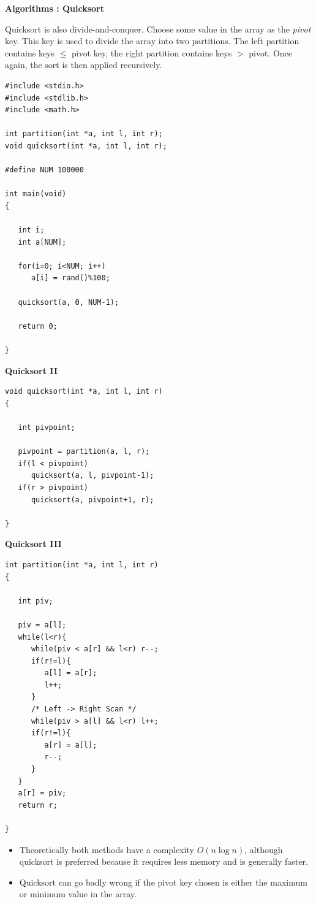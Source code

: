 \newpage
{\samepage
\begin{center}
{\Large{\bf Algorithms : Quicksort}}
\end{center}
Quicksort is also divide-and-conquer. Choose some value
in the array as the {\it pivot} key. This key is used to divide
the array into two partitions. The left partition contains keys
$\leq$ pivot key, the right partition contains keys $>$ pivot.
Once again, the sort is then applied recursively.
{\small
\begin{verbatim}
#include <stdio.h>
#include <stdlib.h>
#include <math.h>

int partition(int *a, int l, int r);
void quicksort(int *a, int l, int r);

#define NUM 100000

int main(void)
{

   int i;
   int a[NUM];

   for(i=0; i<NUM; i++)
      a[i] = rand()%100;

   quicksort(a, 0, NUM-1);

   return 0;

}
\end{verbatim}
}}

\newpage
{\samepage
\begin{center}
{\Large{\bf Quicksort II}}
\end{center}
\begin{verbatim}
void quicksort(int *a, int l, int r)
{

   int pivpoint;

   pivpoint = partition(a, l, r);
   if(l < pivpoint)
      quicksort(a, l, pivpoint-1);
   if(r > pivpoint)
      quicksort(a, pivpoint+1, r);

}

\end{verbatim}
}

\newpage
{\samepage
\begin{center}
{\Large{\bf Quicksort III}}
\end{center}
{\small
\begin{verbatim}
int partition(int *a, int l, int r)
{

   int piv;

   piv = a[l];
   while(l<r){
      while(piv < a[r] && l<r) r--;
      if(r!=l){
         a[l] = a[r];
         l++;
      }
      /* Left -> Right Scan */
      while(piv > a[l] && l<r) l++;
      if(r!=l){
         a[r] = a[l];
         r--;
      }
   }
   a[r] = piv;
   return r;

}
\end{verbatim}
\begin{itemize}
\item Theoretically both methods have a complexity $O(n \log n)$,
although quicksort is preferred because it requires less memory and
is generally faster.
\item Quicksort can go badly wrong if the pivot key chosen is either
the maximum or minimum value in the array.
\end{itemize}
}}

